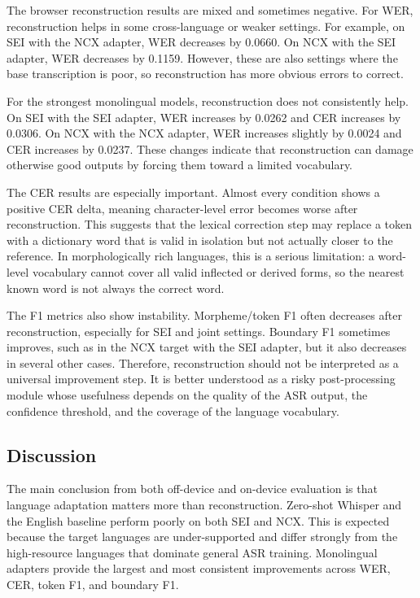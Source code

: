 \documentclass[11pt]{article}
\begin{document}
The browser reconstruction results are mixed and sometimes negative. For WER, reconstruction helps in some cross-language or weaker settings. For example, on SEI with the NCX adapter, WER decreases by 0.0660. On NCX with the SEI adapter, WER decreases by 0.1159. However, these are also settings where the base transcription is poor, so reconstruction has more obvious errors to correct.

For the strongest monolingual models, reconstruction does not consistently help. On SEI with the SEI adapter, WER increases by 0.0262 and CER increases by 0.0306. On NCX with the NCX adapter, WER increases slightly by 0.0024 and CER increases by 0.0237. These changes indicate that reconstruction can damage otherwise good outputs by forcing them toward a limited vocabulary.

The CER results are especially important. Almost every condition shows a positive CER delta, meaning character-level error becomes worse after reconstruction. This suggests that the lexical correction step may replace a token with a dictionary word that is valid in isolation but not actually closer to the reference. In morphologically rich languages, this is a serious limitation: a word-level vocabulary cannot cover all valid inflected or derived forms, so the nearest known word is not always the correct word.

The F1 metrics also show instability. Morpheme/token F1 often decreases after reconstruction, especially for SEI and joint settings. Boundary F1 sometimes improves, such as in the NCX target with the SEI adapter, but it also decreases in several other cases. Therefore, reconstruction should not be interpreted as a universal improvement step. It is better understood as a risky post-processing module whose usefulness depends on the quality of the ASR output, the confidence threshold, and the coverage of the language vocabulary.

\subsection{Discussion}

The main conclusion from both off-device and on-device evaluation is that language adaptation matters more than reconstruction. Zero-shot Whisper and the English baseline perform poorly on both SEI and NCX. This is expected because the target languages are under-supported and differ strongly from the high-resource languages that dominate general ASR training. Monolingual adapters provide the largest and most consistent improvements across WER, CER, token F1, and boundary F1.
\end{document}
